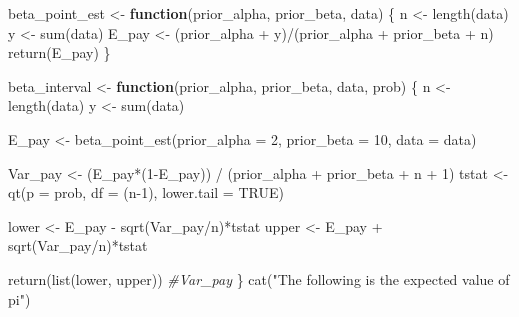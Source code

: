 \documentclass[
]{article}
\newenvironment{Shaded}{\begin{snugshade}}{\end{snugshade}}
\newcommand{\AttributeTok}[1]{\textcolor[rgb]{0.77,0.63,0.00}{#1}}
\newcommand{\CommentTok}[1]{\textcolor[rgb]{0.56,0.35,0.01}{\textit{#1}}}
\newcommand{\ConstantTok}[1]{\textcolor[rgb]{0.00,0.00,0.00}{#1}}
\newcommand{\ControlFlowTok}[1]{\textcolor[rgb]{0.13,0.29,0.53}{\textbf{#1}}}
\newcommand{\DecValTok}[1]{\textcolor[rgb]{0.00,0.00,0.81}{#1}}
\newcommand{\FunctionTok}[1]{\textcolor[rgb]{0.00,0.00,0.00}{#1}}
\newcommand{\NormalTok}[1]{#1}
\newcommand{\OtherTok}[1]{\textcolor[rgb]{0.56,0.35,0.01}{#1}}
\newcommand{\SpecialCharTok}[1]{\textcolor[rgb]{0.00,0.00,0.00}{#1}}
\newcommand{\StringTok}[1]{\textcolor[rgb]{0.31,0.60,0.02}{#1}}
\begin{document}
\begin{Shaded}
\begin{Highlighting}[]
\NormalTok{beta\_point\_est }\OtherTok{\textless{}{-}} \ControlFlowTok{function}\NormalTok{(prior\_alpha,}
\NormalTok{                           prior\_beta,}
\NormalTok{                           data) \{}
\NormalTok{  n }\OtherTok{\textless{}{-}} \FunctionTok{length}\NormalTok{(data)}
\NormalTok{  y }\OtherTok{\textless{}{-}} \FunctionTok{sum}\NormalTok{(data)}
\NormalTok{  E\_pay }\OtherTok{\textless{}{-}}\NormalTok{ (prior\_alpha }\SpecialCharTok{+}\NormalTok{ y)}\SpecialCharTok{/}\NormalTok{(prior\_alpha }\SpecialCharTok{+}\NormalTok{ prior\_beta }\SpecialCharTok{+}\NormalTok{ n)}
  \FunctionTok{return}\NormalTok{(E\_pay)}
\NormalTok{\}}

\NormalTok{beta\_interval }\OtherTok{\textless{}{-}} \ControlFlowTok{function}\NormalTok{(prior\_alpha,}
\NormalTok{                          prior\_beta,}
\NormalTok{                          data,}
\NormalTok{                          prob) \{}
\NormalTok{  n }\OtherTok{\textless{}{-}} \FunctionTok{length}\NormalTok{(data)}
\NormalTok{  y }\OtherTok{\textless{}{-}} \FunctionTok{sum}\NormalTok{(data)}
  
\NormalTok{  E\_pay }\OtherTok{\textless{}{-}} \FunctionTok{beta\_point\_est}\NormalTok{(}\AttributeTok{prior\_alpha =} \DecValTok{2}\NormalTok{,}
                          \AttributeTok{prior\_beta  =} \DecValTok{10}\NormalTok{,}
                          \AttributeTok{data =}\NormalTok{ data)}

\NormalTok{  Var\_pay }\OtherTok{\textless{}{-}}\NormalTok{ (E\_pay}\SpecialCharTok{*}\NormalTok{(}\DecValTok{1}\SpecialCharTok{{-}}\NormalTok{E\_pay)) }\SpecialCharTok{/}\NormalTok{ (prior\_alpha }\SpecialCharTok{+}\NormalTok{ prior\_beta }\SpecialCharTok{+}\NormalTok{ n }\SpecialCharTok{+} \DecValTok{1}\NormalTok{)}
\NormalTok{  tstat   }\OtherTok{\textless{}{-}} \FunctionTok{qt}\NormalTok{(}\AttributeTok{p =}\NormalTok{ prob, }\AttributeTok{df =}\NormalTok{ (n}\DecValTok{{-}1}\NormalTok{), }\AttributeTok{lower.tail =} \ConstantTok{TRUE}\NormalTok{)}
  
\NormalTok{  lower }\OtherTok{\textless{}{-}}\NormalTok{ E\_pay }\SpecialCharTok{{-}} \FunctionTok{sqrt}\NormalTok{(Var\_pay}\SpecialCharTok{/}\NormalTok{n)}\SpecialCharTok{*}\NormalTok{tstat }
\NormalTok{  upper }\OtherTok{\textless{}{-}}\NormalTok{ E\_pay }\SpecialCharTok{+} \FunctionTok{sqrt}\NormalTok{(Var\_pay}\SpecialCharTok{/}\NormalTok{n)}\SpecialCharTok{*}\NormalTok{tstat}
  
  \FunctionTok{return}\NormalTok{(}\FunctionTok{list}\NormalTok{(lower, upper))}
  \CommentTok{\#Var\_pay}
\NormalTok{\}}
\FunctionTok{cat}\NormalTok{(}\StringTok{"The following is the expected value of pi"}\NormalTok{)}
\end{Highlighting}
\end{Shaded}
\end{document}

